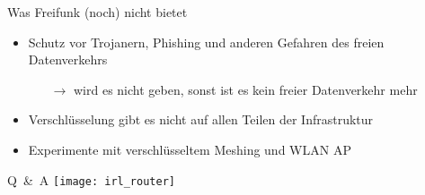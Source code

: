 \documentclass{beamer}
\begin{document}
\begin{frame}{Was Freifunk (noch) nicht bietet}
\vfill
\begin{itemize}
\pause\item Schutz vor Trojanern, Phishing und anderen Gefahren des freien Datenverkehrs
\begin{itemize}
\pause\item[$\rightarrow$] wird es nicht geben, sonst ist es kein freier Datenverkehr mehr
\end{itemize}
\vfill
\pause\item Verschlüsselung gibt es nicht auf allen Teilen der Infrastruktur
\vfill
\pause\item Experimente mit verschlüsseltem Meshing und WLAN AP
\end{itemize}
\vfill
\end{frame}

\begin{frame}{Q~\&~A}
\vfill
\centering
\texttt{[image: irl\_router]}
\vfill
\end{frame}
\end{document}

